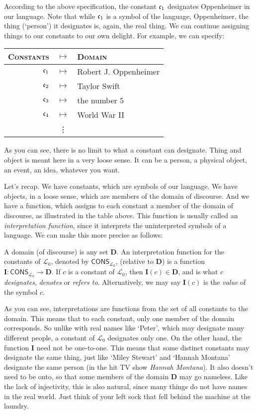 According to the above specification, the constant $\mathfrak{c}_{1}$ designates Oppenheimer in our language. Note that while $\mathfrak{c}_{1}$ is a symbol of the language, Oppenheimer, the thing (`person') it designates is, again, the real thing. We can continue assigning things to our constants to our own delight. For example, we can specify:
\begin{center}
	\begin{tabular}{rcl}
		\textsc{Constants} & $\mapsto$ & \textsc{Domain}\\\hline
		$\mathfrak{c}_{1}$ & $\mapsto$ & Robert J. Oppenheimer\\
		$\mathfrak{c}_{2}$ & $\mapsto$ & Taylor Swift\\
		$\mathfrak{c}_{3}$ & $\mapsto$ & the number $5$\\
		$\mathfrak{c}_{4}$ & $\mapsto$ & World War II\\
		& \vdots & 
	\end{tabular}
\end{center}

As you can see, there is no limit to what a constant can designate. Thing and object is meant here in a very loose sense. It can be a person, a physical object, an event, an idea, whatever you want. 

Let's recap. We have constants, which are symbols of our language. We have objects, in a loose sense, which are members of the domain of discourse. And we have a function, which assigns to each constant a member of the domain of discourse, as illustrated in the table above. This function is usually called an \textit{interpretation function}, since it interprets the uninterpreted symbols of a language. We can make this more precise as follows:

\begin{defn}
A domain (of discourse) is any set $\mathbf{D}$. An interpretation function for the constants of $\mathcal{L}_0$, denoted by $\mathsf{CONS}_{\mathcal{L}_0}$, (relative to $\mathbf{D}$) is a function $\mathbf{I}: \mathsf{CONS}_{\mathcal{L}_0} \to \mathbf{D}$. If $c$ is a constant of $\mathcal{L}_0$, then $\mathbf{I}(c) \in \mathbf{D}$, and is what $c$ \textit{designates}, \textit{denotes} or \textit{refers to}. Alternatively, we may say $\mathbf{I}(c)$ is the \textit{value} of the symbol $c$. 
\end{defn}

As you can see, interpretations are functions from the set of all constants to the domain. This means that to each constant, only one member of the domain corresponds. So unlike with real names like `Peter', which may designate many different people, a constant of $\mathcal{L}_0$ designates only one. On the other hand, the function $\mathbf{I}$ need not be one-to-one. This means that some distinct constants may designate the same thing, just like `Miley Stewart' and `Hannah Montana' designate the same person (in the hit TV show \textit{Hannah Montana}). It also doesn't need to be onto, so that some members of the domain $\mathbf{D}$ may go nameless. Like the lack of injectivity, this is also natural, since many things do not have names in the real world. Just think of your left sock that fell behind the machine at the laundry. 

